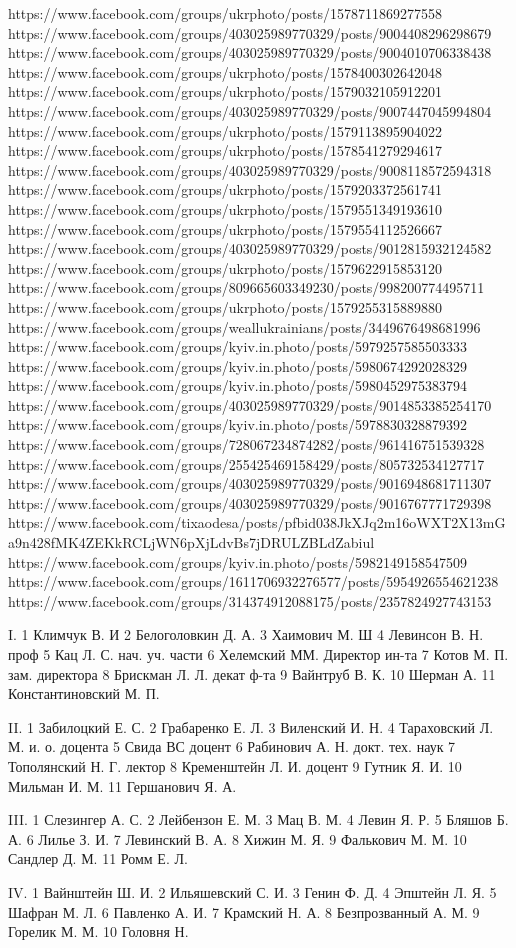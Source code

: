 https://www.facebook.com/groups/ukrphoto/posts/1578711869277558
https://www.facebook.com/groups/403025989770329/posts/9004408296298679
https://www.facebook.com/groups/403025989770329/posts/9004010706338438
https://www.facebook.com/groups/ukrphoto/posts/1578400302642048
https://www.facebook.com/groups/ukrphoto/posts/1579032105912201
https://www.facebook.com/groups/403025989770329/posts/9007447045994804
https://www.facebook.com/groups/ukrphoto/posts/1579113895904022
https://www.facebook.com/groups/ukrphoto/posts/1578541279294617
https://www.facebook.com/groups/403025989770329/posts/9008118572594318
https://www.facebook.com/groups/ukrphoto/posts/1579203372561741
https://www.facebook.com/groups/ukrphoto/posts/1579551349193610
https://www.facebook.com/groups/ukrphoto/posts/1579554112526667
https://www.facebook.com/groups/403025989770329/posts/9012815932124582
https://www.facebook.com/groups/ukrphoto/posts/1579622915853120
https://www.facebook.com/groups/809665603349230/posts/998200774495711
https://www.facebook.com/groups/ukrphoto/posts/1579255315889880
https://www.facebook.com/groups/weallukrainians/posts/3449676498681996
https://www.facebook.com/groups/kyiv.in.photo/posts/5979257585503333
https://www.facebook.com/groups/kyiv.in.photo/posts/5980674292028329
https://www.facebook.com/groups/kyiv.in.photo/posts/5980452975383794
https://www.facebook.com/groups/403025989770329/posts/9014853385254170
https://www.facebook.com/groups/kyiv.in.photo/posts/5978830328879392
https://www.facebook.com/groups/728067234874282/posts/961416751539328
https://www.facebook.com/groups/255425469158429/posts/805732534127717
https://www.facebook.com/groups/403025989770329/posts/9016948681711307
https://www.facebook.com/groups/403025989770329/posts/9016767771729398
https://www.facebook.com/tixaodesa/posts/pfbid038JkXJq2m16oWXT2X13mGa9n428fMK4ZEKkRCLjWN6pXjLdvBs7jDRULZBLdZabiul
https://www.facebook.com/groups/kyiv.in.photo/posts/5982149158547509
https://www.facebook.com/groups/1611706932276577/posts/5954926554621238
https://www.facebook.com/groups/314374912088175/posts/2357824927743153

I. 1 Климчук В. И
   2 Белоголовкин Д. А.
   3 Хаимович М. Ш
   4 Левинсон В. Н. проф
   5 Кац Л. С. нач. уч. части
   6 Хелемский ММ. Директор ин-та
   7 Котов М. П. зам. директора
   8 Брискман Л. Л. декат ф-та
   9 Вайнтруб В. К.
   10 Шерман А.
   11 Константиновский М. П.

II. 1 Забилоцкий Е. С.
    2 Грабаренко Е. Л.
    3 Виленский И. Н.
    4 Тараховский Л. М. и. о. доцента
    5 Свида ВС доцент
    6 Рабинович А. Н. докт. тех. наук
    7 Тополянский Н. Г. лектор
    8 Кременштейн Л. И. доцент
    9 Гутник Я. И.
    10 Мильман И. М.
    11 Гершанович Я. А.

III. 1 Слезингер А. С.
     2 Лейбензон Е. М.
     3 Мац В. М.
     4 Левин Я. Р.
     5 Бляшов Б. А.
     6 Лилье З. И.
     7 Левинский В. А.
     8 Хижин М. Я.
     9 Фалькович М. М.
     10 Сандлер Д. М.
     11 Ромм Е. Л.

IV. 1 Вайнштейн Ш. И.
    2 Ильяшевский С. И.
    3 Генин Ф. Д.
    4 Эпштейн Л. Я.
    5 Шафран М. Л.
    6 Павленко А. И.
    7 Крамский Н. А.
    8 Безпрозванный А. М.
    9 Горелик М. М.
    10 Головня Н.


